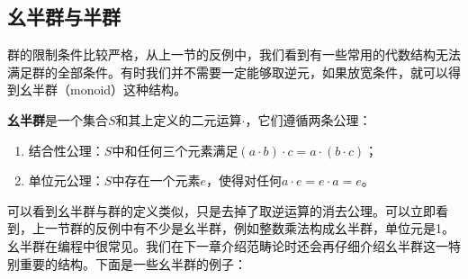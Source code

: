 \documentclass{article}
\begin{document}
\subsection{幺半群与半群}
群的限制条件比较严格，从上一节的反例中，我们看到有一些常用的代数结构无法满足群的全部条件。有时我们并不需要一定能够取逆元，如果放宽条件，就可以得到幺半群（monoid）这种结构。

\begin{definition}
\textbf{幺半群}是一个集合$S$和其上定义的二元运算$\cdot$，它们遵循两条公理：
\begin{enumerate}
\item 结合性公理：$S$中和任何三个元素满足$(a \cdot b) \cdot c = a \cdot (b \cdot c)$；
\item 单位元公理：$S$中存在一个元素$e$，使得对任何$a \cdot e = e \cdot a = e$。
\end{enumerate}
\end{definition}

可以看到幺半群与群的定义类似，只是去掉了取逆运算的消去公理。可以立即看到，上一节群的反例中有不少是幺半群，例如整数乘法构成幺半群，单位元是1。幺半群在编程中很常见。我们在下一章介绍范畴论时还会再仔细介绍幺半群这一特别重要的结构。下面是一些幺半群的例子：
\end{document}
